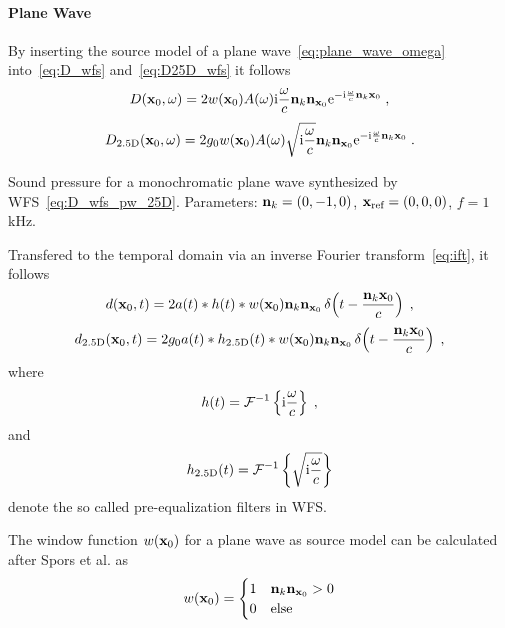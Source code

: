 \paragraph{Plane Wave}
%
%
By inserting the source model of a plane wave~\eqref{eq:plane_wave_omega}
into~\eqref{eq:D_wfs} and~\eqref{eq:D25D_wfs} it follows
%
\begin{equation}
    D(\x_0,\omega) = 2 w(\x_0) A(\omega) \I\omegac \n_k\n_{\x_0}
    \E^{-\I\omegac\n_k\x_0} \qc
    \label{eq:D_wfs_pw}
\end{equation}
%
\begin{equation}
    D_\twohalfD(\x_0,\omega) = 2g_0 w(\x_0) A(\omega) \sqrt{\I\omegac} \n_k\n_{\x_0} 
    \E^{-\I\omegac\n_k\x_0} \qp
    \label{eq:D_wfs_pw_25D}
\end{equation}
%
\begin{marginfigure}[-0.5cm]
    \centering
    \ft
    
    \caption{Sound pressure for a monochromatic plane wave synthesized by
        \twohalfD \ac{WFS}~\eqref{eq:D_wfs_pw_25D}. Parameters: $\mathbf{n}_k = (0,-1,0)$, $\mathbf{x}_\text{ref}
        = (0,0,0)$, $f = 1$\,kHz.
        }
\end{marginfigure}
%
Transfered to the temporal domain via an inverse Fourier
transform~\eqref{eq:ift}, it follows
%
\begin{equation}
    d(\x_0,t) = 2 a(t) * h(t) * w(\x_0) \n_k \n_{\x_0} \deltafunc{t -
    \frac{\n_k\x_0}{c}} \qc
    \label{eq:d_wfs_pw}
\end{equation}
%
\begin{equation}
    d_\twohalfD(\x_0,t) = 2g_0 a(t) * h_\twohalfD(t) * w(\x_0) \n_k \n_{\x_0}
    \deltafunc{t - \frac{\n_k\x_0}{c}} \qc
    \label{eq:d_wfs_pw_25D}
\end{equation}
%
where
\begin{equation}
    h(t) = \IFT{\I\omegac} \qc
    \label{eq:wfs_preeq}
\end{equation}
and
\begin{equation}
    h_\twohalfD(t) = \IFT{\sqrt{\I\omegac}}
    \label{eq:wfs_preeq25D}
\end{equation}
denote the so called pre-equalization filters in \ac{WFS}.

The window function $w(\mathbf{x}_0)$ for a plane wave as source model can be
calculated after Spors et al. as\autocite{Spors2008}
%
\begin{equation}
    w(\x_0) = 
    \begin{cases}
        1 & \n_k \n_{\x_0} > 0 \\
        0 & \text{else}
    \end{cases}
    \label{eq:w_pw}
\end{equation}
%



